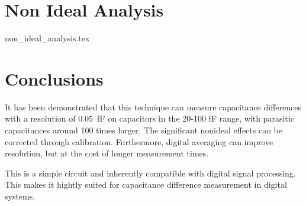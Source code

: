 \documentclass[
	letterpaper,
	a4paper,
	cleardoublepage=empty,
	headings=twolinechapter,
	numbers=autoenddot,
]{report}
\begin{document}
	\section*{Non Ideal Analysis}
	
	{non_ideal_analysis.tex}
		
	\section*{Conclusions}
	
	It has been demonstrated that this technique can measure capacitance differences with a resolution of \SI{0.05}{\femto\farad} on capacitors in the 20-100 \si{\femto\farad} range, with parasitic capacitances around 100 times larger\cite{Kung1988}. The significant nonideal effects can be corrected through calibration. Furthermore, digital averaging can improve resolution, but at the cost of longer measurement times.
	
	This is a simple circuit and inherently compatible with digital signal processing. This makes it hightly suited for capacitance difference measurement in digital systems.
	
	
	
	
	
\end{document}
